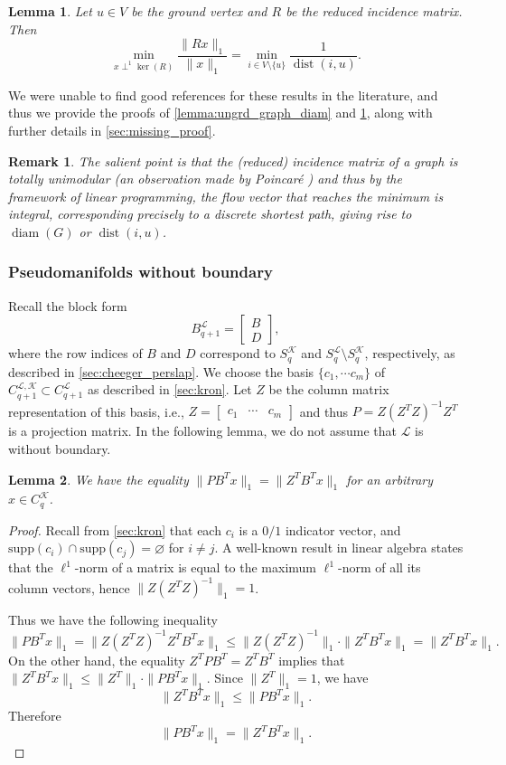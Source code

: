 \documentclass{article}
\newtheorem{lemma}{Lemma}[section]
\newtheorem{remark}{Remark}[section]
\newcommand{\KK}{\mathcal{K}}
\newcommand{\LL}{\mathcal{L}}
\newcommand{\dist}{\operatorname{dist}}
\newcommand{\diam}{\operatorname{diam}}
\begin{document}
\begin{lemma}\label{lemma:grd_graph_diam}
Let $u\in V$ be the ground vertex and $R$ be the reduced incidence matrix.
Then
\begin{equation}\label{eq:grd_graph_diam}
\min_{x\perp^1\ker(R)}\frac{\|Rx\|_1}{\|x\|_1}=
\min_{i\in V\setminus\{u\}}\frac{1}{\dist(i,u)}.
\end{equation}
\end{lemma}

We were unable to find good references for these results in the literature, and thus we provide the proofs of \cref{lemma:ungrd_graph_diam} and \cref{lemma:grd_graph_diam}, along with further details in \cref{sec:missing_proof}.
\begin{remark}
The salient point is that the (reduced) incidence matrix of a graph is totally unimodular (an observation made by Poincar\'{e} \cite{poincare}) and thus by the framework of linear programming,
the flow vector that reaches the minimum is integral, corresponding precisely to a discrete shortest path, giving rise to $\diam(G)$ or $\dist(i, u)$.
\end{remark}

\subsubsection{Pseudomanifolds without boundary}
Recall the block form 
\[
B_{q+1}^{\LL}
=
\begin{bmatrix}
B\\
D
\end{bmatrix},
\]
where the row indices of \(B\) and \(D\) correspond to \(S_q^{\KK}\) and
\(S_q^{\LL}\setminus S_q^{\KK}\), respectively, as described in \cref{sec:cheeger_perslap}. We choose the basis $\{c_1,\cdots c_m\}$ of $C_{q+1}^{\LL, \KK}\subset C_{q+1}^\LL$ as described in \cref{sec:kron}.
Let $Z$ be the column matrix representation of this basis,
i.e.,
$Z=\begin{bmatrix}
    c_1 & \cdots & c_m
\end{bmatrix}$ and thus $P=Z(Z^TZ)^{-1}Z^T$ is a projection matrix. 
In the following lemma, we do not assume that $\LL$ is without boundary.
\begin{lemma}\label{lemma:PZ_l_1_norm}
We have the equality $\|PB^Tx\|_1=\|Z^TB^Tx\|_1$ for an arbitrary $x\in C_q^\KK$.
\end{lemma}

\begin{proof}
Recall from \cref{sec:kron} that each $c_i$ is a $0/1$ indicator vector, 
and $\mathrm{supp}(c_i)\cap\mathrm{supp}(c_j)=\varnothing$ for $i\neq j$. A well-known result in linear algebra states that the $\ell^1$-norm of a matrix is equal to the maximum $\ell^1$-norm of all its column vectors,
hence $\|Z(Z^TZ)^{-1}\|_1=1$.

Thus we have the following inequality
\[
\|PB^Tx\|_1=\|Z(Z^TZ)^{-1}Z^TB^Tx\|_1
\leq \|Z(Z^TZ)^{-1}\|_1\cdot\|Z^TB^Tx\|_1=\|Z^TB^Tx\|_1.
\]
On the other hand,
the equality $Z^TPB^T=Z^TB^T$ implies that $\|Z^TB^Tx\|_1\leq \|Z^T\|_1\cdot\|PB^Tx\|_1$.
Since $\|Z^T\|_1=1$,
we have 
\[\|Z^TB^Tx\|_1\leq \|PB^Tx\|_1.
\]
Therefore
\[
\|PB^Tx\|_1=\|Z^TB^Tx\|_1.
\]
\end{proof}
\end{document}
